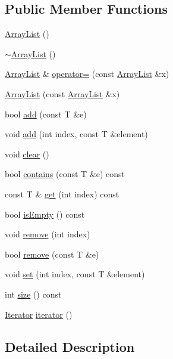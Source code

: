 \subsection*{Public Member Functions}
\begin{DoxyCompactItemize}
\item 
\hyperlink{class_array_list_a77ba51ae82bb2246563af5c4d64d438e}{Array\-List} ()
\item 
\hyperlink{class_array_list_a4af637822f64b61267b1e0ed4d4fca33}{$\sim$\-Array\-List} ()
\item 
\hyperlink{class_array_list}{Array\-List} \& \hyperlink{class_array_list_a1402bb47d6b3ff2bd4a85b399b47ed43}{operator=} (const \hyperlink{class_array_list}{Array\-List} \&x)
\item 
\hyperlink{class_array_list_a26a0ec7d7ef42629aadc2d80cc3dd79a}{Array\-List} (const \hyperlink{class_array_list}{Array\-List} \&x)
\item 
bool \hyperlink{class_array_list_a901a15ad355382ca8ff9b6af52c45bb4}{add} (const T \&e)
\item 
void \hyperlink{class_array_list_aab84cd5b5f384c75f82435510174b063}{add} (int index, const T \&element)
\item 
void \hyperlink{class_array_list_acb53d54675318c94332d0ec8b6819eb3}{clear} ()
\item 
bool \hyperlink{class_array_list_a42ababd87cc9201d1e2b094afb491f35}{contains} (const T \&e) const 
\item 
const T \& \hyperlink{class_array_list_a3f0e007a5e5fe15fc2cba68a486aa52e}{get} (int index) const 
\item 
bool \hyperlink{class_array_list_a9960a0e31e9e8d3be18c023cf5153df3}{is\-Empty} () const 
\item 
void \hyperlink{class_array_list_ac95cf76569c70453fc31141adcc2bbcb}{remove} (int index)
\item 
bool \hyperlink{class_array_list_a778ee61fb6c7fe5049785dac553ca5fd}{remove} (const T \&e)
\item 
void \hyperlink{class_array_list_ac14d91b42cca9eceb6393e4d25519a7c}{set} (int index, const T \&element)
\item 
int \hyperlink{class_array_list_aff9c6ac40886044e4653174950d23e74}{size} () const 
\item 
\hyperlink{class_array_list_1_1_iterator}{Iterator} \hyperlink{class_array_list_af44d06bd430e58dafa3f781cafdc0d9b}{iterator} ()
\end{DoxyCompactItemize}


\subsection{Detailed Description}
